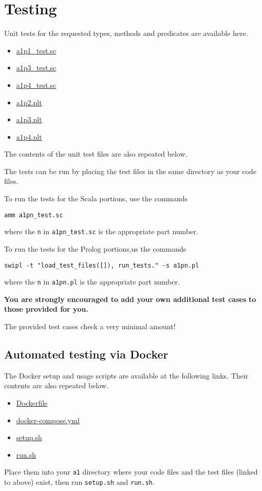 \documentclass[11pt]{article}
\begin{document}
\section*{Testing}
\label{sec:org1bc8893}
Unit tests for the requested types, methods and predicates
are available here.
\begin{itemize}
\item \href{./testing/a1/a1p1\_test.sc}{a1p1\_test.sc}
\item \href{./testing/a1/a1p3\_test.sc}{a1p3\_test.sc}
\item \href{./testing/a1/a1p4\_test.sc}{a1p4\_test.sc}
\item \href{./testing/a1/a1p2.plt}{a1p2.plt}
\item \href{./testing/a1/a1p3.plt}{a1p3.plt}
\item \href{./testing/a1/a1p4.plt}{a1p4.plt}
\end{itemize}
The contents of the unit test files are also repeated below.

The tests can be run by placing the test files
in the same directory as your code files.

To run the tests for the Scala portions, use the commands
\begin{verbatim}
amm a1pn_test.sc
\end{verbatim}
where the \texttt{n} in \texttt{a1pn\_test.sc} is the appropriate part number.

To run the tests for the Prolog portions,us the commands
\begin{verbatim}
swipl -t "load_test_files([]), run_tests." -s a1pn.pl
\end{verbatim}
where the \texttt{n} in \texttt{a1pn.pl} is the appropriate part number.

\begin{center}
\textbf{You are strongly encouraged to add your own additional test cases}
\textbf{to those provided for you.}

The provided test cases check a very minimal amount!
\end{center}

\subsection*{Automated testing via Docker}
\label{sec:org4307ef5}
The Docker setup and usage scripts are available at the following links.
Their contents are also repeated below.
\begin{itemize}
\item \href{./testing/a1/Dockerfile}{Dockerfile}
\item \href{./testing/a1/docker-compose.yml}{docker-compose.yml}
\item \href{./testing/a1/setup.sh}{setup.sh}
\item \href{./testing/a1/run.sh}{run.sh}
\end{itemize}
Place them into your \texttt{a1} directory where your code files
and the test files (linked to above) exist,
then run \texttt{setup.sh} and \texttt{run.sh}.
\end{document}
